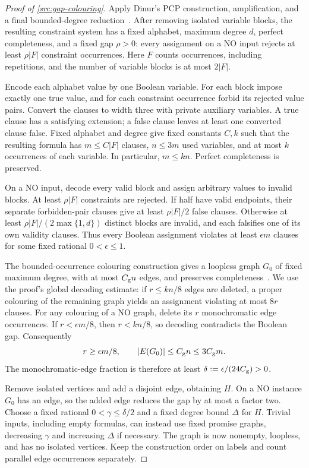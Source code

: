 \documentclass[11pt]{article} \usepackage[utf8]{inputenc}
\theoremstyle{plain} \newtheorem{theorem}{Theorem}[section]
\theoremstyle{definition} \newaliascnt{definition}{theorem}
\begin{document}
\begin{proof}[Proof of \cref{src:gap-colouring}]
Apply Dinur's PCP construction, amplification, and a final bounded-degree
reduction~\cite[Lemma~8.3, Theorem~1.5, and Lemma~1.7]{dinur2007pcp}.
After removing isolated variable blocks, the resulting constraint system has a
fixed alphabet, maximum degree $d$, perfect completeness, and a fixed gap
$\rho>0$: every assignment on a NO input rejects at least $\rho|F|$ constraint
occurrences. Here $F$ counts occurrences, including repetitions, and the number
of variable blocks is at most $2|F|$.

Encode each alphabet value by one Boolean variable. For each block impose
exactly one true value, and for each constraint occurrence forbid its rejected
value pairs. Convert the clauses to width three with private auxiliary
variables. A true clause has a satisfying extension; a false clause leaves at
least one converted clause false. Fixed alphabet and degree give fixed
constants $C,k$ such that the resulting formula has $m\le C|F|$ clauses,
$n\le3m$ used variables, and at most $k$ occurrences of each variable.
In particular, $m\le kn$. Perfect completeness is preserved.

On a NO input, decode every valid block and assign arbitrary values to invalid
blocks. At least $\rho|F|$ constraints are rejected.
If half have valid endpoints, their separate forbidden-pair clauses give at
least $\rho|F|/2$ false clauses. Otherwise at least
$\rho|F|/(2\max\{1,d\})$ distinct blocks are invalid, and each falsifies one of
its own validity clauses. Thus every Boolean assignment violates at least
$\epsilon m$ clauses for some fixed rational $0<\epsilon\le1$.

The bounded-occurrence colouring construction gives a loopless graph $G_0$ of
fixed maximum degree, with at most $C_{\rm g}n$ edges, and preserves
completeness~\cite[Theorem~14 and its proof, pp.~98--99]{bogdanov2002lower}.
We use the proof's global decoding estimate: if $r\le kn/8$ edges are deleted,
a proper colouring of the remaining graph yields an assignment violating at
most $8r$ clauses. For any colouring of a NO graph, delete its $r$
monochromatic edge occurrences. If $r<\epsilon m/8$, then
$r<kn/8$, so decoding contradicts the Boolean gap. Consequently
\[
r\ge\epsilon m/8,\qquad
|E(G_0)|\le C_{\rm g}n\le3C_{\rm g}m.
\]
The monochromatic-edge fraction is therefore at least
$\delta:=\epsilon/(24C_{\rm g})>0$.

Remove isolated vertices and add a disjoint edge, obtaining $H$. On a NO
instance $G_0$ has an edge, so the added edge reduces the gap by at most a
factor two. Choose a fixed rational $0<\gamma\le\delta/2$ and a fixed degree
bound $\Delta$ for $H$. Trivial inputs, including empty formulas, can instead
use fixed promise graphs, decreasing $\gamma$ and increasing $\Delta$ if
necessary. The graph is now nonempty, loopless, and has no isolated vertices.
Keep the construction order on labels and count parallel edge occurrences
separately.


\end{proof}
\end{document}

